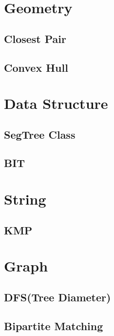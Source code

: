 \documentclass[10pt,landscape,a4paper,twocolumn]{article}
\begin{document}
\tableofcontents


\section{Geometry}
\subsection{Closest Pair}


\subsection{Convex Hull}



\section{Data Structure}

\subsection{SegTree Class}


\subsection{BIT}


\section{String}
\subsection{KMP}


\section{Graph}
\subsection{DFS(Tree Diameter)}


\subsection{Bipartite Matching}

\end{document}
